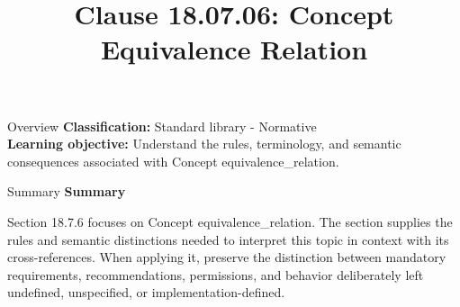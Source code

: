 \documentclass[10pt,letterpaper]{article}
\title{Clause 18.07.06: Concept Equivalence Relation}
\author{}
\date{}
\begin{document}
\maketitle
\begin{CornellOverviewBox}{Overview}
\textbf{Classification:} Standard library - Normative\\[2pt]
\textbf{Learning objective:} Understand the rules, terminology, and semantic consequences associated with Concept equivalence\_relation.
\end{CornellOverviewBox}\begin{CornellSummaryBox}{Summary}
{\sffamily\bfseries\color{Accent} Summary}\par\vspace{3pt}Section 18.7.6 focuses on Concept equivalence\_relation. The section supplies the rules and semantic distinctions needed to interpret this topic in context with its cross-references. When applying it, preserve the distinction between mandatory requirements, recommendations, permissions, and behavior deliberately left undefined, unspecified, or implementation-defined.
\end{CornellSummaryBox}
\end{document}
